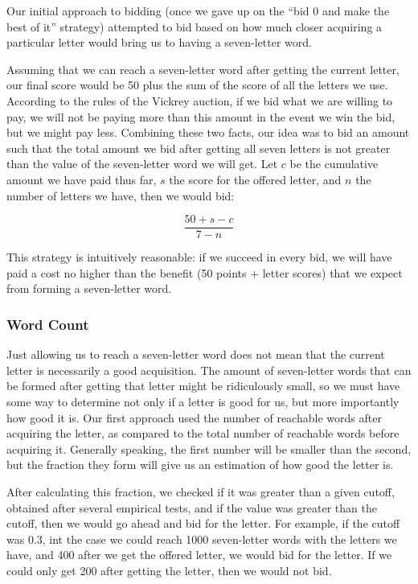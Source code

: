 \documentclass[11pt]{article}
\begin{document}
Our initial approach to bidding (once we gave up on the ``bid 0 and make the best of it'' strategy) attempted to bid based on how much closer acquiring a particular letter would bring us to having a seven-letter word.  

Assuming that we can reach a seven-letter word after getting the current letter, our final score would be 50 plus the sum of the score of all the letters we use. According to the rules of the Vickrey auction, if we bid what we are willing to pay, we will not be paying more than this amount in the event we win the bid, but we might pay less. Combining these two facts, our idea was to bid an amount such that the total amount we bid after getting all seven letters is not greater than the value of the seven-letter word we will get. Let $c$ be the cumulative amount we have paid thus far, $s$ the score for the offered letter, and $n$ the number of letters we have, then we would bid:

$$\frac{50+s-c}{7-n}$$

This strategy is intuitively reasonable: if we succeed in every bid, we will have paid a cost no higher than the benefit (50 points + letter scores) that we expect from forming a seven-letter word.

\subsubsection{Word Count}

Just allowing us to reach a seven-letter word does not mean that the current letter is necessarily a good acquisition. The amount of seven-letter words that can be formed after getting that letter might be ridiculously small, so we must have some way to determine not only if a letter is good for us, but more importantly how good it is. Our first approach used the number of reachable words after acquiring the letter, as compared to the total number of reachable words before acquiring it. Generally speaking, the first number will be smaller than the second, but the fraction they form will give us an estimation of how good the letter is.

After calculating this fraction, we checked if it was greater than a given cutoff, obtained after several empirical tests, and if the value was greater than the cutoff, then we would go ahead and bid for the letter. For example, if the cutoff was 0.3, int the case we could reach 1000 seven-letter words with the letters we have, and 400 after we get the offered letter, we would bid for the letter. If we could only get 200 after getting the letter, then we would not bid. 
\end{document}
